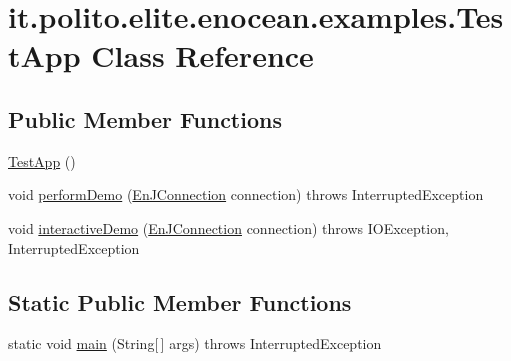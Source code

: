 \hypertarget{classit_1_1polito_1_1elite_1_1enocean_1_1examples_1_1_test_app}{}\section{it.\+polito.\+elite.\+enocean.\+examples.\+Test\+App Class Reference}
\label{classit_1_1polito_1_1elite_1_1enocean_1_1examples_1_1_test_app}
\subsection*{Public Member Functions}
\begin{DoxyCompactItemize}
\item 
\hyperlink{classit_1_1polito_1_1elite_1_1enocean_1_1examples_1_1_test_app_a19dbea1142071b0aefadf45ec2ae1ff6}{Test\+App} ()
\item 
void \hyperlink{classit_1_1polito_1_1elite_1_1enocean_1_1examples_1_1_test_app_a3f7d2899536e795b0fa17a12e3aa71de}{perform\+Demo} (\hyperlink{classit_1_1polito_1_1elite_1_1enocean_1_1enj_1_1communication_1_1_en_j_connection}{En\+J\+Connection} connection)  throws Interrupted\+Exception 	
\item 
void \hyperlink{classit_1_1polito_1_1elite_1_1enocean_1_1examples_1_1_test_app_a0deb4d651135f6f9a09d656c1b76f1cf}{interactive\+Demo} (\hyperlink{classit_1_1polito_1_1elite_1_1enocean_1_1enj_1_1communication_1_1_en_j_connection}{En\+J\+Connection} connection)  throws I\+O\+Exception, 			\+Interrupted\+Exception 	
\end{DoxyCompactItemize}
\subsection*{Static Public Member Functions}
\begin{DoxyCompactItemize}
\item 
static void \hyperlink{classit_1_1polito_1_1elite_1_1enocean_1_1examples_1_1_test_app_a0c43e0505d5b029fd18071bd76f46bc8}{main} (String\mbox{[}$\,$\mbox{]} args)  throws Interrupted\+Exception 	
\end{DoxyCompactItemize}
